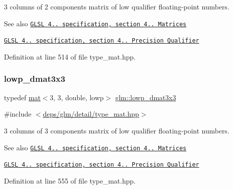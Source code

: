 3 columns of 2 components matrix of low qualifier floating-\/point numbers.

\begin{DoxySeeAlso}{See also}
\href{http://www.opengl.org/registry/doc/GLSLangSpec.4.20.8.pdf}{\tt G\+L\+SL 4.. specification, section 4.. Matrices} 

\href{http://www.opengl.org/registry/doc/GLSLangSpec.4.20.8.pdf}{\tt G\+L\+SL 4.. specification, section 4.. Precision Qualifier} 
\end{DoxySeeAlso}


Definition at line 514 of file type\+\_\+mat.\+hpp.

\mbox{\label{group__core__precision_gacc5689588709eb4ccf582f21cd9af38c}} 
\subsubsection{\texorpdfstring{lowp\+\_\+dmat3x3}{lowp\_dmat3x3}}
{\footnotesize\ttfamily typedef \hyperlink{structglm_1_1mat}{mat}$<$3, 3, double, lowp$>$ \hyperlink{group__core__precision_gacc5689588709eb4ccf582f21cd9af38c}{glm\+::lowp\+\_\+dmat3x3}}



{\ttfamily \#include $<$\hyperlink{type__mat_8hpp}{deps/glm/detail/type\+\_\+mat.\+hpp}$>$}

3 columns of 3 components matrix of low qualifier floating-\/point numbers.

\begin{DoxySeeAlso}{See also}
\href{http://www.opengl.org/registry/doc/GLSLangSpec.4.20.8.pdf}{\tt G\+L\+SL 4.. specification, section 4.. Matrices} 

\href{http://www.opengl.org/registry/doc/GLSLangSpec.4.20.8.pdf}{\tt G\+L\+SL 4.. specification, section 4.. Precision Qualifier} 
\end{DoxySeeAlso}


Definition at line 555 of file type\+\_\+mat.\+hpp.

\mbox{\label{group__core__precision_ga5a806e50b4cb26784620e98c8c03f03b}} 
